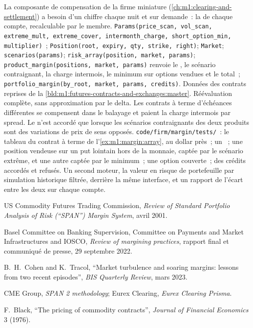 \begin{build}
 La composante de compensation de la firme miniature
(\cref{ch:m1:clearing-and-settlement}) a besoin d'un chiffre chaque nuit et sur demande~: la 
de chaque compte, recalculable par le membre.  \texttt{Params(price\_scan, vol\_scan, extreme\_mult,
extreme\_cover, intermonth\_charge, short\_option\_min, multiplier)}~;
\texttt{Position(root, expiry, qty, strike, right)}; \texttt{Market};
\texttt{scenarios(params)}; \texttt{risk\_array(position, market, params)};
\texttt{product\_margin(positions, market, params)} renvoie le ,
le scénario contraignant, la charge intermois, le minimum sur options vendues
et le total~; \texttt{portfolio\_margin(by\_root, market, params, credits)}.
 Données des contrats reprises de
la \cref{bld:m1:futures-contracts-and-exchanges:master}. Réévaluation complète, sans approximation par le delta.
Les contrats à terme d'échéances différentes se compensent dans le balayage et paient la charge
intermois par spread. Le  n'est accordé que lorsque les scénarios contraignants
des deux produits sont des variations de prix
de sens opposés.
 \texttt{code/firm/margin/tests/}~: le tableau du contrat à terme
de l'\cref{ex:m1:margin:array}, au dollar près~; un ~; une position vendeuse sur un put lointain hors de la monnaie,
captée par le scénario extrême, et une autre captée par le minimum~; une option couverte~;
des crédits accordés et refusés.
 Un second moteur, la valeur en risque de portefeuille par
simulation historique filtrée, derrière la même interface, et un rapport de l'écart
entre les deux sur chaque compte.
\end{build}

\begin{omsources}
\item US Commodity Futures Trading Commission, \emph{Review of Standard
Portfolio Analysis of Risk (``SPAN'') Margin System}, avril 2001.
\item Basel Committee on Banking Supervision, Committee on Payments and
Market Infrastructures and IOSCO, \emph{Review of margining practices},
rapport final et communiqué de presse, 29 septembre 2022.
\item B.~H.~Cohen and K.~Tracol, ``Market turbulence and soaring margins:
lessons from two recent episodes'', \emph{BIS Quarterly Review}, mars 2023.
\item CME Group, \emph{SPAN 2 methodology}; Eurex Clearing, \emph{Eurex
Clearing Prisma}.
\item F.~Black, ``The pricing of commodity contracts'', \emph{Journal of
Financial Economics} 3 (1976).
\end{omsources}


